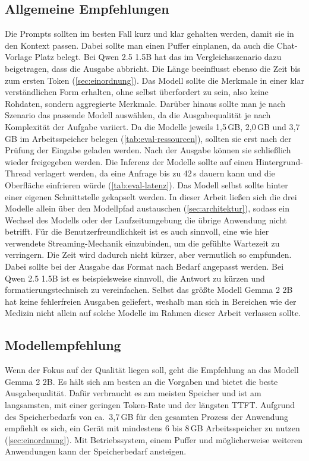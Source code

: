 \subsection{Allgemeine Empfehlungen}
Die Prompts sollten im besten Fall kurz und klar gehalten werden, damit sie in den Kontext passen. Dabei sollte man einen Puffer einplanen, da auch die Chat-Vorlage Platz belegt. Bei Qwen 2.5 1.5B hat das im Vergleichsszenario dazu beigetragen, dass die Ausgabe abbricht. Die Länge beeinflusst ebenso die Zeit bis zum ersten Token (\autoref{sec:einordnung}).
Das Modell sollte die Merkmale in einer klar verständlichen Form erhalten, ohne selbst überfordert zu sein, also keine Rohdaten, sondern aggregierte Merkmale.
Darüber hinaus sollte man je nach Szenario das passende Modell auswählen, da die Ausgabequalität je nach Komplexität der Aufgabe variiert.
Da die Modelle jeweils 1,5\,GB, 2,0\,GB und 3,7\,GB im Arbeitsspeicher belegen (\autoref{tab:eval-ressourcen}), sollten sie erst nach der Prüfung der Eingabe geladen werden. Nach der Ausgabe können sie schließlich wieder freigegeben werden.
Die Inferenz der Modelle sollte auf einen Hintergrund-Thread verlagert werden, da eine Anfrage bis zu 42\,s dauern kann und die Oberfläche einfrieren würde (\autoref{tab:eval-latenz}).
Das Modell selbst sollte hinter einer eigenen Schnittstelle gekapselt werden. In dieser Arbeit ließen sich die drei Modelle allein über den Modellpfad austauschen (\autoref{sec:architektur}), sodass ein Wechsel des Modells oder der Laufzeitumgebung die übrige Anwendung nicht betrifft.
Für die Benutzerfreundlichkeit ist es auch sinnvoll, eine wie hier verwendete Streaming-Mechanik einzubinden, um die gefühlte Wartezeit zu verringern. Die Zeit wird dadurch nicht kürzer, aber vermutlich so empfunden. Dabei sollte bei der Ausgabe das Format nach Bedarf angepasst werden.
Bei Qwen 2.5 1.5B ist es beispielsweise sinnvoll, die Antwort zu kürzen und formatierungstechnisch zu vereinfachen. Selbst das größte Modell Gemma 2 2B hat keine fehlerfreien Ausgaben geliefert, weshalb man sich in Bereichen wie der Medizin nicht allein auf solche Modelle im Rahmen dieser Arbeit verlassen sollte.

\subsection{Modellempfehlung}
Wenn der Fokus auf der Qualität liegen soll, geht die Empfehlung an das Modell Gemma 2 2B. Es hält sich am besten an die Vorgaben und bietet die beste Ausgabequalität. Dafür verbraucht es am meisten Speicher und ist am langsamsten, mit einer geringen Token-Rate und der längsten \ac{TTFT}. Aufgrund des Speicherbedarfs von ca.\ 3,7\,GB für den gesamten Prozess der Anwendung empfiehlt es sich, ein Gerät mit mindestens 6 bis 8\,GB Arbeitsspeicher zu nutzen (\autoref{sec:einordnung}). Mit Betriebssystem, einem Puffer und möglicherweise weiteren Anwendungen kann der Speicherbedarf ansteigen.
\vspace{\baselineskip}

